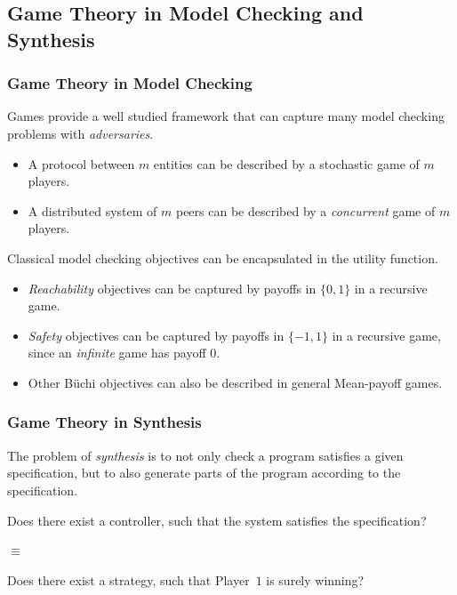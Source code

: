 \documentclass[english, aspectratio=169]{beamer}
\begin{document}
\subsection{Game Theory in Model Checking and Synthesis}
\begin{frame}
  \frametitle{Game Theory in Model Checking}
  Games provide a well studied framework that can capture many model checking
  problems with \emph{adversaries}.
  \begin{itemize}
  \item A protocol between $m$ entities can be described by a stochastic game of
    $m$ players.
  \item A distributed system of $m$ peers can be described by a
    \emph{concurrent} game of $m$ players.
  \end{itemize}

  \vspace{6pt} \pause Classical model checking objectives can be encapsulated in
  the utility function.
  \begin{itemize}
  \item \emph{Reachability} objectives can be captured by payoffs in $\{ 0,1 \}$
    in a recursive game.
  \item \emph{Safety} objectives can be captured by payoffs in $\{ -1, 1 \}$ in
    a recursive game, since an \emph{infinite} game has payoff $0$.
  \item Other Büchi objectives can also be described in general Mean-payoff games.
  \end{itemize}
\end{frame}

\begin{frame}
  \frametitle{Game Theory in Synthesis}

  The problem of \emph{synthesis} is to not only check a program satisfies a
  given specification, but to also generate parts of the program according to
  the specification.

  \begin{center}
    Does there exist a controller, such that the system satisfies the
    specification?

    \pause
    \vspace{10pt} $\equiv$ \vspace{10pt}

    Does there exist a strategy, such that Player~$1$ is surely winning?
  \end{center}
\end{frame}
\end{document}
